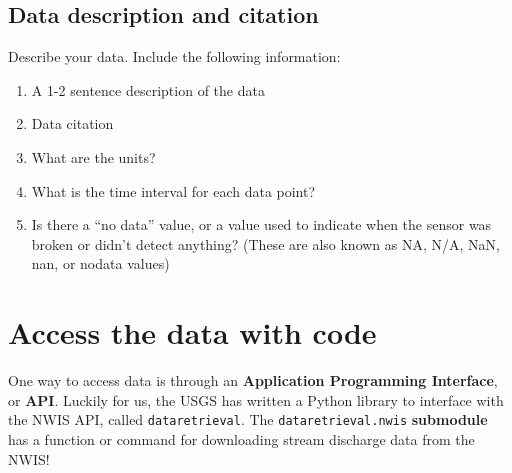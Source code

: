 \documentclass[
  letterpaper,
  DIV=11,
  numbers=noendperiod,
  oneside]{scrreprt}
\providecommand{\tightlist}{%
  \setlength{\itemsep}{0pt}\setlength{\parskip}{0pt}}
\begin{document}
\subsection{Data description and
citation}\label{data-description-and-citation}

\begin{tcolorbox}[enhanced jigsaw, colbacktitle=quarto-callout-color!10!white, opacityback=0, bottomtitle=1mm, toptitle=1mm, bottomrule=.15mm, left=2mm, colframe=quarto-callout-color-frame, leftrule=.75mm, opacitybacktitle=0.6, colback=white, rightrule=.15mm, toprule=.15mm, breakable, titlerule=0mm, title=\textcolor{quarto-callout-color}{\faInfo}\hspace{0.5em}{Reflect and Respond}, coltitle=black, arc=.35mm]

Describe your data. Include the following information:

\begin{enumerate}
\def\labelenumi{\arabic{enumi}.}
\tightlist
\item
  A 1-2 sentence description of the data
\item
  Data citation
\item
  What are the units?
\item
  What is the time interval for each data point?
\item
  Is there a ``no data'' value, or a value used to indicate when the
  sensor was broken or didn't detect anything? (These are also known as
  NA, N/A, NaN, nan, or nodata values)
\end{enumerate}

\end{tcolorbox}

\section{Access the data with code}\label{access-the-data-with-code}

One way to access data is through an \textbf{Application Programming
Interface}, or \textbf{API}. Luckily for us, the USGS has written a
Python library to interface with the NWIS API, called
\texttt{dataretrieval}. The \texttt{dataretrieval.nwis}
\textbf{submodule} has a function or command for downloading stream
discharge data from the NWIS!
\end{document}
